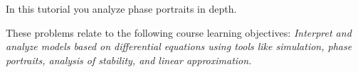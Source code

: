 %
% 
%
		
		
\begin{objectives}
	In this tutorial you analyze phase portraits in depth.

	These problems relate to the following course learning objectives:
	\textit{Interpret and analyze models based on differential equations using tools like simulation, phase
	portraits, analysis of stability, and linear approximation.}
\end{objectives}

	\vspace{-1em}
